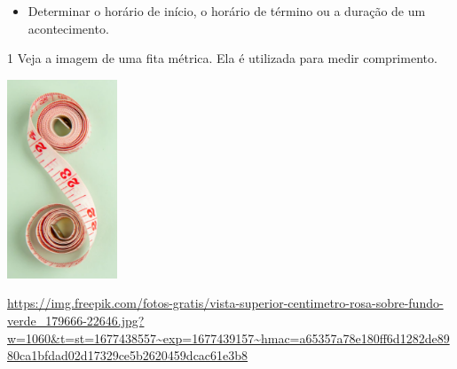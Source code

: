 \begin{escolha}
\begin{itemize}
    \item Determinar o horário de início, o horário de término ou a duração de
um acontecimento.
\end{itemize}




\num{1} Veja a imagem de uma fita métrica. Ela é utilizada para medir comprimento.

\includegraphics[width=1.29167in,height=2.33463in]{media/image41.png}

\url{https://img.freepik.com/fotos-gratis/vista-superior-centimetro-rosa-sobre-fundo-verde_179666-22646.jpg?w=1060\&t=st=1677438557~exp=1677439157~hmac=a65357a78e180ff6d1282de8980ca1bfdad02d17329ce5b2620459dcac61e3b8}


\end{escolha}
